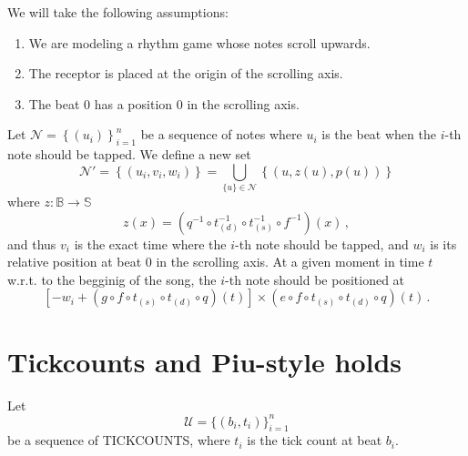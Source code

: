 \documentclass[a4paper,9pt]{article}
\begin{document}
    We will take the following assumptions:
    \begin{enumerate}
	    \item We are modeling a rhythm game whose notes scroll upwards.
	    \item The receptor is placed at the origin of the scrolling axis.
	    \item The beat 0 has a position 0 in the scrolling axis.
    \end{enumerate}

    Let $ \mathcal{N} =  \left\{ \left( u_{i} \right) \right\}_{i=1}^{n} $ be a sequence of notes where $ u_{i} $ is the beat when the $ i $-th note should be tapped. We define a new set 
    \begin{equation}
	    \mathcal{N'} = \left\{ \left( u_{i}, v_i, w_i \right) \right\} = \bigcup_{\{u\}\in \mathcal{N}} \left\{ \left(u, z(u), p(u) \right) \right\}
	    \label{eq:set}
    \end{equation}
    where $ z: \mathbb{B}\rightarrow \mathbb{S} $
    \begin{equation}
	    z(x) = \left( q^{-1}\circ t_{(d)}^{-1}\circ t_{(s)}^{-1}\circ f^{-1}\right)(x)\,,
	    \label{eq:final-g}
    \end{equation}
    and thus $ v_i $ is the exact time where the $ i $-th note should be tapped, and $ w_i $ is its relative position at beat 0 in the scrolling axis.
    At a given moment in time $ t $ w.r.t. to the begginig of the song, the $ i $-th note should be positioned at
    \begin{equation}
	    \left[- w_i + \left(g\circ f\circ t_{(s)}\circ t_{(d)}\circ q \right)(t) \right] \times \left( e\circ f\circ t_{(s)}\circ t_{(d)}\circ q \right)(t)\,.
	    \label{eq:final-position}
    \end{equation}

\appendix

\section{Tickcounts and Piu-style holds}

Let 
\begin{equation}
	\mathcal{U} = \{(b_{i},t_{i})\}_{i=1}^{n}	
\end{equation}
be a sequence of TICKCOUNTS, where $ t_{i} $ is the tick count at beat $ b_{i} $. 
\end{document}
